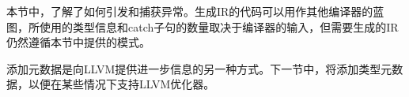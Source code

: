 本节中，了解了如何引发和捕获异常。生成IR的代码可以用作其他编译器的蓝图，所使用的类型信息和catch子句的数量取决于编译器的输入，但需要生成的IR仍然遵循本节中提供的模式。

添加元数据是向LLVM提供进一步信息的另一种方式。下一节中，将添加类型元数据，以便在某些情况下支持LLVM优化器。









































